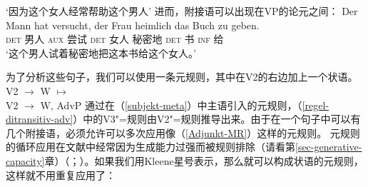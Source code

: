 \glt `因为这个女人经常帮助这个男人'
\z
进而，附接语可以出现在VP的论元之间：
\ea
\gll Der Mann hat versucht, der Frau heimlich das Buch zu geben.\\
	\textsc{det} 男人 \textsc{aux} 尝试 \textsc{det} 女人 秘密地 \textsc{det} 书 \textsc{inf} 给\\
\glt `这个男人试着秘密地把这本书给这个女人。'
\z 

\noindent
为了分析这些句子，我们可以使用一条元规则，其中在V2的右边加上一个状语\citep[]{Uszkoreit87a}。
\ea
\label{Adjunkt-MR}
V2  $\to$ W $\mapsto$\\
V2  $\to$ W, AdvP
\z 
通过在（\ref{subjekt-meta}）中主语引入的元规则，（\ref{regel-ditransitiv-adv}）中的V3"=规则由V2"=规则推导出来。由于在一个句子中可以有几个附接语，必须允许可以多次应用像（\ref{Adjunkt-MR}）这样的元规则。
元规则的循环应用在文献中经常因为生成能力过强而被规则排除（请看第\ref{sec-generative-capacity}章）（\citealp{Thompson82a-u}；\citealp[]{Uszkoreit87a}）。如果我们用Kleene星号\isc{*}\is{*}表示，那么就可以构成状语的元规则，这样就不用重复应用了\citep[]{Uszkoreit87a}：
